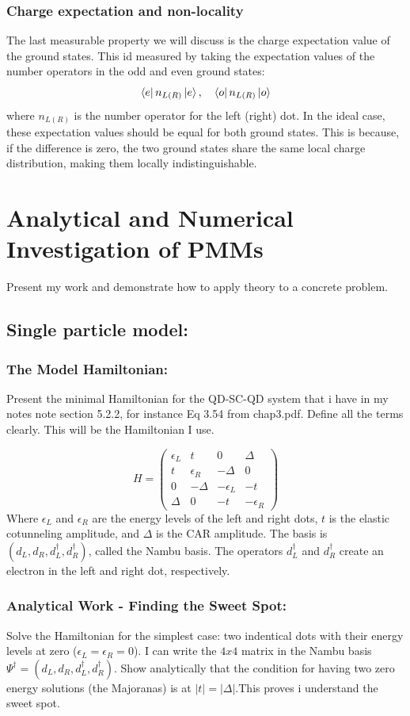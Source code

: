 \documentclass[11pt, letterpaper, titlepage]{article}
\begin{document}
\subsubsection{Charge expectation and non-locality}
The last measurable property we will discuss is the charge expectation value of the ground states. This id measured by taking the expectation values of the number operators in the odd and even ground states:
$$
\bra{e}n_{L(R)} \ket{e}, \quad \bra{o}n_{L(R)} \ket{o}
$$
where $n_{L(R)}$ is the number operator for the left (right) dot. In the ideal case, these expectation values should be equal for both ground states. This is because, if the difference is zero, the two ground states share the same local charge distribution, making them locally indistinguishable. 


\section{Analytical and Numerical Investigation of PMMs}
Present my work and demonstrate how to apply theory to a concrete problem.\par
\subsection{Single particle model:}
\subsubsection{The Model Hamiltonian:} Present the minimal Hamiltonian for the QD-SC-QD system that i have in my notes note section 5.2.2, for instance Eq 3.54 from chap3.pdf. Define all the terms clearly. This will be the Hamiltonian I use.\par
$$  
  H = \begin{pmatrix}
    ϵ_L & t & 0 & Δ \\
    t & ϵ_R & -Δ & 0 \\
    0 & -Δ & -ϵ_L & -t \\
    Δ & 0 & -t & -ϵ_R
  \end{pmatrix}
$$
Where $ϵ_L$ and $ϵ_R$ are the energy levels of the left and right dots, $t$ is the elastic cotunneling amplitude, and $Δ$ is the CAR amplitude. The basis is $(d_L, d_R, d_L^{†}, d_R^{†})$, called the Nambu basis. The operators $d_L^{†}$ and $d_R^{†}$ create an electron in the left and right dot, respectively.\par

\subsubsection{Analytical Work - Finding the Sweet Spot:} Solve the Hamiltonian for the simplest case: two indentical dots with their energy levels at zero ($ϵ_L = ϵ_R = 0$). I can write the $4x4$ matrix in the Nambu basis $Ψ^{†}= (d_L, d_R, d_L^{†}, d_R^{†})$. Show analytically that the condition for having two zero energy solutions (the Majoranas) is at $|t| = |Δ|$.This proves i understand the sweet spot.\par
\end{document}
